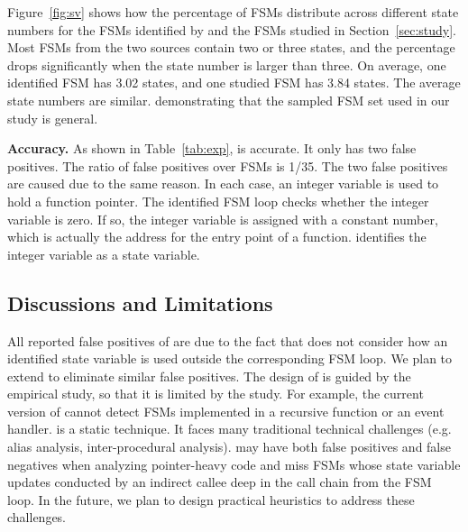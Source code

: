 Figure~\ref{fig:sv} shows how the percentage of FSMs distribute 
across different state numbers for the FSMs identified by \Tool{} 
and the FSMs studied in Section~\ref{sec:study}. 
Most FSMs from the two sources contain two or three states, 
and the percentage drops significantly when the state number is larger than three. 
On average, one identified FSM has 3.02 states, 
and one studied FSM has 3.84 states. 
The average state numbers are similar. 
demonstrating that the sampled FSM set used in our study is general. 




\noindent\textbf{Accuracy.}
As shown in Table~\ref{tab:exp}, \Tool{} is accurate.
It only has two false positives.
The ratio of false positives over FSMs is 1/35.
The two false positives are caused due to the same reason.
In each case, an integer variable is used to hold a function pointer.
The identified FSM loop checks whether the integer variable is zero.%
If so, the integer variable is assigned with a constant number,
which is actually the address for the entry point of a function.
\Tool{} identifies the integer variable as a state variable.



\subsection{Discussions and Limitations}

All reported false positives of \Tool{} are due to the fact that 
\Tool{} does not consider how an identified state variable is used outside 
the corresponding FSM loop. 
We plan to extend \Tool{} to eliminate similar false positives. 
The design of \Tool{} is guided by the empirical study, so that it is limited by the study. 
For example, the current version of \Tool{} cannot detect FSMs implemented 
in a recursive function or an event handler. 
\Tool{} is a static technique. 
It faces many traditional technical challenges (e.g. alias analysis, inter-procedural analysis).
\Tool{} may have both false positives and false negatives when analyzing 
pointer-heavy code and miss FSMs whose state variable updates conducted 
by an indirect callee deep in the call chain from the FSM loop. 
In the future, we plan to design practical 
heuristics to address these challenges.   
 


